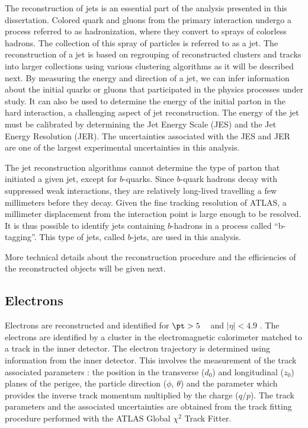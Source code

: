 The reconstruction of jets is an essential part of the analysis presented in this dissertation. 
Colored quark and gluons from the primary interaction  undergo a process referred to as hadronization,
where they convert to sprays of colorless hadrons. The collection of this spray of particles is 
referred to as a jet. 
The reconstruction of a jet is based on regrouping of reconstructed clusters and tracks into larger collections using
various clustering algorithms as it will be described next.
By measuring the energy and direction of a jet, we can infer information 
about the initial quarks or gluons that participated in the physics processes under study.
It can also be used to determine the energy of the initial parton in the hard interaction, 
a challenging aspect of jet reconstruction.
The energy of the jet must be calibrated by determining the 
Jet Energy Scale (JES) and the Jet Energy Resolution (JER).%
The uncertainties associated with the JES and JER are one of the largest 
experimental uncertainties in this analysis.

The jet reconstruction algorithms cannot determine the type of parton that initiated a
given jet, except for $b$-quarks.
Since $b$-quark hadrons decay with suppressed weak interactions, they are 
relatively long-lived travelling a few millimeters before they decay.
Given the fine tracking resolution of ATLAS, 
a millimeter displacement from the interaction point is large enough to be resolved.
It is thus possible to identify jets containing $b$-hadrons  in a process called ``b-tagging''.
This type of jets, called $b$-jets, are used in this analysis.

More technical details about the reconstruction procedure and the efficiencies 
of the reconstructed objects will be given next.

\subsection{Electrons}
Electrons are reconstructed and identified for $\pt > 5$ \GeV~ and
 $|\eta| < 4.9$ \cite{ATLAS-CONF-2016-024}.
The electrons  are identified by a cluster in the electromagnetic calorimeter 
matched to a track in the inner detector.
The electron trajectory is determined using information from the inner detector. This involves the measurement of the track associated parameters : the
position in the transverse ($d_0$) and longitudinal ($z_0$) planes of the perigee, the particle direction ($\phi$, $\theta$)
and the parameter which provides the inverse track momentum multiplied by the charge ($q/p$). The track
parameters and the associated uncertainties are obtained from the track fitting procedure performed with
the ATLAS Global $\chi^2$ Track Fitter.


